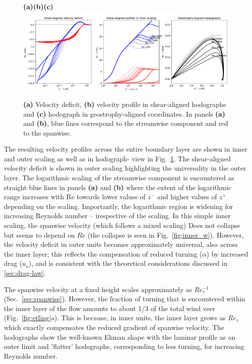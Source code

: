\documentclass[smallcondensed,final]{svjour3}
\newcommand{\RE}{\mathrm{Re}}
\begin{document}
%
\begin{figure}
  \phantom{AAA}\textbf{(a)\hspace{0.3\textwidth}(b)\hspace{0.3\textwidth}(c)}\\
  \includegraphics[width=\textwidth]{../plot/ekman_profiles.pdf}
  \caption{ \textbf{(a)} Velocity deficit, \textbf{(b)} velocity profile in shear-aligned hodographs and \textbf{(c)} hodograph in geostrophy-aligned coordinates.
   In panels \textbf{(a)} and \textbf{(b)}, blue lines correspond to the streamwise component and red to the spanwise. }
  \label{fig:summary} 
\end{figure} 
The resulting velocity profiles across the entire boundary layer are shown in inner and outer scaling as well as in ho\-do\-graph- view in Fig.~\ref{fig:summary}. The shear-aligned velocity deficit is shown in outer scaling highlighting the universality in the outer layer. 
% 
The logarithmic scaling of the streamwise component is encountered as straight blue lines in panels \textbf{(a)} and \textbf{(b)} where 
the extent of the logarithmic range increases with $\RE$ towards lower values of $z^-$ and higher values of $z^+$ depending on the scaling. 
Importantly, the logarithmic region is widening for increasing Reynolds number -- irespective of the scaling. 
% 
In this simple inner scaling, the spanwise velocity (which follows a mixed scaling) 
Does not collapse but seems to depend on $Re$ (the collapse is seen in Fig.~\ref{fig:inner_w}).
% 
However, the velocity deficit in outer units becomes approximately universal, also across the inner layer; 
this reflects the compensation of reduced turning ($\alpha$) by increased drag ($u_\star$), 
and is consistent with the theoretical considerations discussed in \ref{sec:drag-law}. 
% 
\par
%
The spanwise velocity at a fixed height scales approximately as $Re_\tau^{-1}$ (Sec.~\ref{sec:spanwise}).
%
However, the fraction  of turning that is encountered within the inner layer of the flow amounts to about 1/3 of the total wind veer  (Fig.~\ref{fig:etling}a).  
%
This is because, in inner units, the inner layer grows as $Re_\tau$  which exactly compensates the reduced gradient of spanwise velocity. 
% 
The hodographs show the well-known Ekman shape with the laminar profile as an outer limit and 'flatter'  hodographs, corresponding to less turning, for increasing Reynolds number. 
\end{document}
